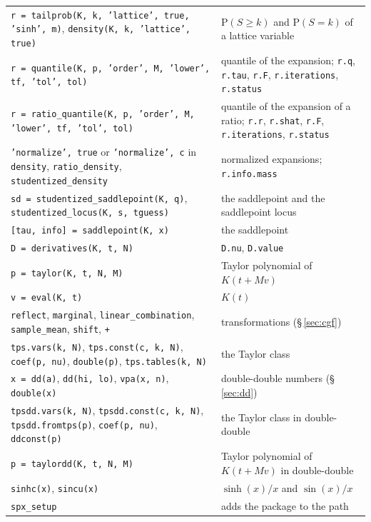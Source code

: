 \documentclass[11pt]{article}
\newcommand{\prog}[1]{\texttt{#1}}
\newcommand{\pr}{\mathrm{P}}
\begin{document}
\begin{longtable}{@{}>{\raggedright\arraybackslash}p{}>{\raggedright\arraybackslash}p{}@{}}
\prog{r = tailprob(K, k, 'lattice', true, 'sinh', m)}, \prog{density(K, k, 'lattice', true)} & $\pr(S\geq k)$ and $\pr(S=k)$ of a lattice variable\\
\prog{r = quantile(K, p, 'order', M, 'lower', tf, 'tol', tol)} & quantile of the expansion; \prog{r.q}, \prog{r.tau}, \prog{r.F}, \prog{r.iterations}, \prog{r.status}\\
\prog{r = ratio\_quantile(K, p, 'order', M, 'lower', tf, 'tol', tol)} & quantile of the expansion of a ratio; \prog{r.r}, \prog{r.shat}, \prog{r.F}, \prog{r.iterations}, \prog{r.status}\\
\prog{'normalize', true} or \prog{'normalize', c} in \prog{density}, \prog{ratio\_density}, \prog{studentized\_density} & normalized expansions; \prog{r.info.mass}\\
\prog{sd = studentized\_saddlepoint(K, q)}, \prog{studentized\_locus(K, s, tguess)} & the saddlepoint and the saddlepoint locus\\
\prog{[tau, info] = saddlepoint(K, x)} & the saddlepoint\\
\prog{D = derivatives(K, t, N)} & \prog{D.nu}, \prog{D.value}\\
\prog{p = taylor(K, t, N, M)} & Taylor polynomial of $K(t+Mv)$\\
\prog{v = eval(K, t)} & $K(t)$\\
\prog{reflect}, \prog{marginal}, \prog{linear\_combination}, \prog{sample\_mean}, \prog{shift}, \prog{+} & transformations (\S\,\ref{sec:cgf})\\
\prog{tps.vars(k, N)}, \prog{tps.const(c, k, N)}, \prog{coef(p, nu)}, \prog{double(p)}, \prog{tps.tables(k, N)} & the Taylor class\\
\prog{x = dd(a)}, \prog{dd(hi, lo)}, \prog{vpa(x, n)}, \prog{double(x)} & double-double numbers (\S\,\ref{sec:dd})\\
\prog{tpsdd.vars(k, N)}, \prog{tpsdd.const(c, k, N)}, \prog{tpsdd.fromtps(p)}, \prog{coef(p, nu)}, \prog{ddconst(p)} & the Taylor class in double-double\\
\prog{p = taylordd(K, t, N, M)} & Taylor polynomial of $K(t+Mv)$ in double-double\\
\prog{sinhc(x)}, \prog{sincu(x)} & $\sinh(x)/x$ and $\sin(x)/x$\\
\prog{spx\_setup} & adds the package to the path\\
\bottomrule
\end{longtable}
\end{document}

